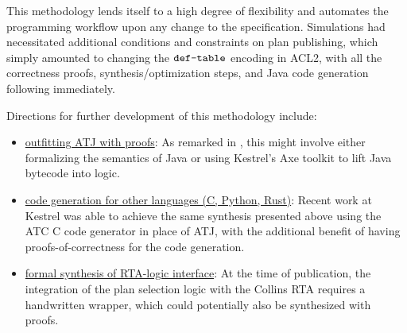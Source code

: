 
This methodology lends itself to a high degree of flexibility and automates the programming workflow upon any change to the specification. Simulations had necessitated additional conditions and constraints on plan publishing, which simply amounted to changing the $\verb+def-table+$ encoding in ACL2, with all the correctness proofs, synthesis/optimization steps, and Java code generation following immediately.


Directions for further development of this methodology include:
\begin{itemize}
\item \underline{outfitting ATJ with proofs}: As remarked in \cite{dasc2020}, this might involve either formalizing the semantics of Java or using Kestrel's Axe toolkit to lift Java bytecode into logic.
\item \underline{code generation for other languages (C, Python, Rust)}: Recent work at Kestrel was able to achieve the same synthesis presented above using the ATC C code generator in place of ATJ, with the additional benefit of having proofs-of-correctness for the code generation.
\item \underline{formal synthesis of RTA-logic interface}: At the time of publication, the integration of the plan selection logic with the Collins RTA requires a handwritten wrapper, which could potentially also be synthesized with proofs.
\end{itemize}
